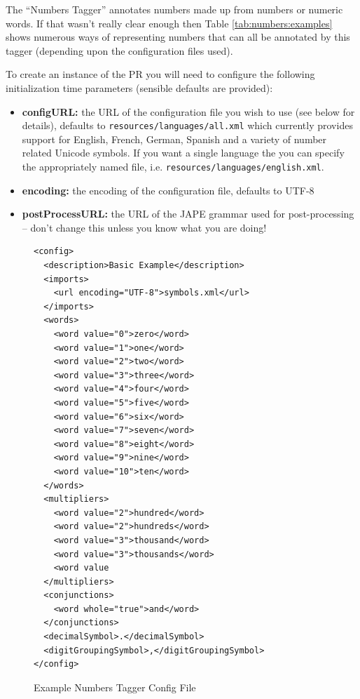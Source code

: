The ``Numbers Tagger'' annotates numbers made up from numbers or numeric words.
If that wasn't really clear enough then Table \ref{tab:numbers:examples} shows
numerous ways of representing numbers that can all be annotated by this tagger
(depending upon the configuration files used).

To create an instance of the PR you will need to configure the following
initialization time parameters (sensible defaults are provided):

\begin{itemize}
\item \textbf{configURL:} the URL of the configuration file you wish to use (see
  below for details), defaults to \texttt{resources/languages/all.xml} which
  currently provides support for English, French, German, Spanish and a variety
  of number related Unicode symbols. If you want a single language the you can
  specify the appropriately named file, i.e.
  \texttt{resources/languages/english.xml}.
\item \textbf{encoding:} the encoding of the configuration file, defaults to
  UTF-8
\item \textbf{postProcessURL:} the URL of the JAPE grammar used for
  post-processing -- don't change this unless you know what you are doing!
\end{itemize}

\begin{figure}
\centering
\begin{small}
\begin{verbatim}
<config>
  <description>Basic Example</description>
  <imports>
    <url encoding="UTF-8">symbols.xml</url>
  </imports>
  <words>
    <word value="0">zero</word>
    <word value="1">one</word>
    <word value="2">two</word>
    <word value="3">three</word>
    <word value="4">four</word>
    <word value="5">five</word>
    <word value="6">six</word>
    <word value="7">seven</word>
    <word value="8">eight</word>
    <word value="9">nine</word>
    <word value="10">ten</word>
  </words>
  <multipliers>
    <word value="2">hundred</word>
    <word value="2">hundreds</word>
    <word value="3">thousand</word>
    <word value="3">thousands</word>
    <word value
  </multipliers>
  <conjunctions>
    <word whole="true">and</word>
  </conjunctions>
  <decimalSymbol>.</decimalSymbol>
  <digitGroupingSymbol>,</digitGroupingSymbol>
</config>
\end{verbatim}
\end{small}
\caption{Example Numbers Tagger Config File}
\label{fig:numbers:example}
\end{figure}

